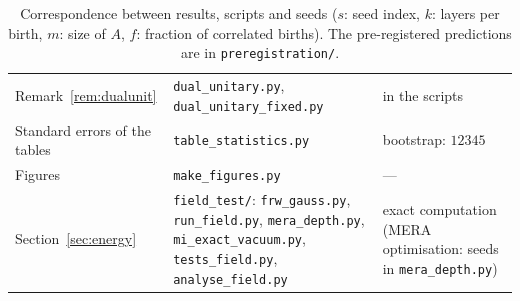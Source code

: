 \begin{table}[h]
\begin{tabular}{p{4.0cm}p{6.2cm}p{4.9cm}}
Remark~\ref{rem:dualunit} & \texttt{dual\_unitary.py}, \texttt{dual\_unitary\_fixed.py} & in the scripts\\
Standard errors of the tables & \texttt{table\_statistics.py} & bootstrap: $12345$\\
Figures & \texttt{make\_figures.py} & ---\\
Section~\ref{sec:energy} & \texttt{field\_test/}: \texttt{frw\_gauss.py}, \texttt{run\_field.py}, \texttt{mera\_depth.py}, \texttt{mi\_exact\_vacuum.py}, \texttt{tests\_field.py}, \texttt{analyse\_field.py} & exact computation (MERA optimisation: seeds in \texttt{mera\_depth.py})\\
\bottomrule
\end{tabular}
\caption{Correspondence between results, scripts and seeds ($s$: seed index, $k$: layers per birth, $m$: size of $A$, $f$: fraction of correlated births). The pre-registered predictions are in \texttt{preregistration/}.}
\label{tab:repro}
\end{table}
